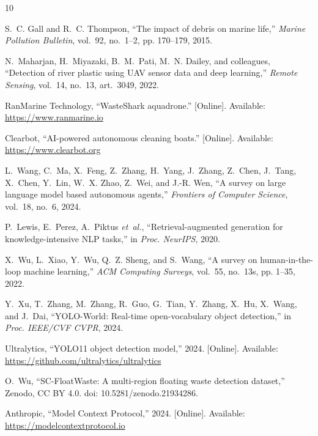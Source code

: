 \documentclass[conference]{IEEEtran}
\begin{document}
%
%
\begin{thebibliography}{10}

S.~C. Gall and R.~C. Thompson, ``The impact of debris on marine life,''
\emph{Marine Pollution Bulletin}, vol.~92, no.~1--2, pp. 170--179, 2015.

N.~Maharjan, H.~Miyazaki, B.~M.~Pati, M.~N. Dailey, and colleagues,
``Detection of river plastic using UAV sensor data and deep learning,''
\emph{Remote Sensing}, vol.~14, no.~13, art.~3049, 2022.

RanMarine Technology, ``WasteShark aquadrone.'' [Online]. Available:
\url{https://www.ranmarine.io}

Clearbot, ``AI-powered autonomous cleaning boats.'' [Online]. Available:
\url{https://www.clearbot.org}

L.~Wang, C.~Ma, X.~Feng, Z.~Zhang, H.~Yang, J.~Zhang, Z.~Chen, J.~Tang,
X.~Chen, Y.~Lin, W.~X. Zhao, Z.~Wei, and J.-R. Wen, ``A survey on large
language model based autonomous agents,'' \emph{Frontiers of Computer
Science}, vol.~18, no.~6, 2024.

P.~Lewis, E.~Perez, A.~Piktus \emph{et~al.}, ``Retrieval-augmented
generation for knowledge-intensive NLP tasks,'' in \emph{Proc. NeurIPS},
2020.

X.~Wu, L.~Xiao, Y.~Wu, Q.~Z. Sheng, and S.~Wang, ``A survey on
human-in-the-loop machine learning,'' \emph{ACM Computing Surveys},
vol.~55, no.~13s, pp. 1--35, 2022.

Y.~Xu, T.~Zhang, M.~Zhang, R.~Guo, G.~Tian, Y.~Zhang, X.~Hu, X.~Wang,
and J.~Dai, ``YOLO-World: Real-time open-vocabulary object detection,''
in \emph{Proc. IEEE/CVF CVPR}, 2024.

Ultralytics, ``YOLO11 object detection model,'' 2024. [Online]. Available:
\url{https://github.com/ultralytics/ultralytics}

O.~Wu, ``SC-FloatWaste: A multi-region floating waste detection dataset,''
Zenodo, CC BY 4.0. doi: 10.5281/zenodo.21934286.

Anthropic, ``Model Context Protocol,'' 2024. [Online]. Available:
\url{https://modelcontextprotocol.io}

\end{thebibliography}
\end{document}
